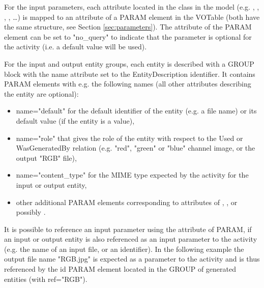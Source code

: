 For the input parameters, each attribute located in the  class in the model (e.g. , , , , \dots) is mapped to an attribute of a PARAM element in the VOTable (both have the same structure, see Section \ref{sec:parameters}).
The  attribute of the PARAM element can be set to "no\_query" to indicate that the parameter is optional for the activity (i.e. a default value will be used).


For the input and output entity groups, each entity is described with a GROUP block with the name attribute set to the EntityDescription identifier. It contains PARAM elements with e.g. the following names (all other attributes describing the entity are optional):
\begin{itemize}
 \item name="default" for the default identifier of the entity (e.g. a file name) or its default value (if the entity is a value),
 \item name="role" that gives the role of the entity with respect to the Used or WasGeneratedBy relation (e.g. "red", "green" or "blue" channel image, or the output "RGB" file),
 \item name="content\_type" for the MIME type expected by the activity for the input or output entity,
 \item other additional PARAM elements corresponding to attributes of , ,  or possibly .
 \end{itemize} 
It is possible to reference an input parameter using the  attribute of PARAM, if an input or output entity is also referenced as an input parameter to the activity (e.g. the name of an input file, or an identifier). In the following example the output file name "RGB.jpg" is expected as a parameter to the activity and is thus referenced by the id PARAM element located in the GROUP of generated entities (with ref="RGB").

